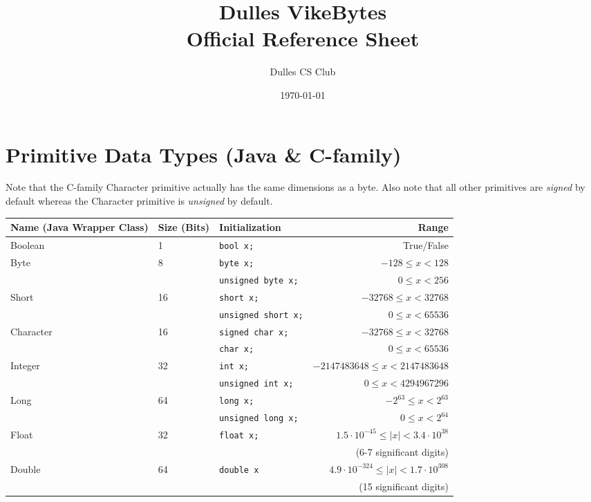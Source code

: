 \documentclass{article}
\title{Dulles VikeBytes\\Official Reference Sheet}
\date{\today}
\author{Dulles CS Club}
\begin{document}

{\let\newpage\relax\maketitle} %

\renewcommand{\arraystretch}{1.25} %
\section{Primitive Data Types (Java \& C-family)}
Note that the C-family Character primitive actually has the same dimensions as a byte. Also note that all other primitives are \textit{signed} by default whereas the Character primitive is \textit{unsigned} by default.
\begin{center}\begin{tabular}{lllr}\toprule
  Name (Java Wrapper Class)      &Size (Bits) &Initialization              &Range \\\midrule
  Boolean   &1           &\lstinline|bool x;|           &True/False \\\midrule
  Byte      &8           &\lstinline|byte x;|           &\(-128 \leq x < 128\) \\
            &            &\lstinline|unsigned byte x;|  &\(0 \leq x < 256\) \\
  Short     &16          &\lstinline|short x;|          &\(-32768 \leq x < 32768\) \\
            &            &\lstinline|unsigned short x;| &\(0 \leq x < 65536\) \\
  Character &16          &\lstinline|signed char x;|    &\(-32768 \leq x < 32768\) \\ 
            &            &\lstinline|char x;|           &\(0 \leq x < 65536\) \\
  Integer   &32          &\lstinline|int x;|            &\(-2147483648 \leq x < 2147483648\) \\
            &            &\lstinline|unsigned int x;|   &\(0 \leq x < 4294967296\) \\
  Long      &64          &\lstinline|long x;|           &\(-2^{63} \leq x < 2^{63}\) \\
            &            &\lstinline|unsigned long x;|  &\(0 \leq x < 2^{64}\) \\\midrule
  Float     &32          &\lstinline|float x;|          &\(1.5\cdot10^{-45} \leq |x| < 3.4\cdot10^{38}\) \\
            &            &                              &(6-7 significant digits) \\
  Double    &64          &\lstinline|double x|          &\(4.9\cdot10^{-324} \leq |x| < 1.7\cdot10^{308}\) \\
            &            &                              &(15 significant digits) \\
\bottomrule\end{tabular}\end{center}
\end{document}
